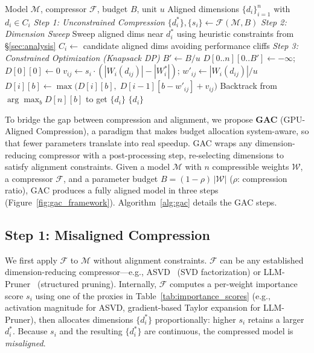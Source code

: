 \documentclass[sigplan,10pt]{acmart}
\begin{document}

\begin{algorithm}[t]
  \caption{GAC algorithm.}
  \label{alg:gac}
  \small
  \begin{algorithmic}[1]
  \Require Model $\mathcal{M}$, compressor $\mathcal{F}$, budget $B$, unit $u$
  \Ensure Aligned dimensions $\{d_i\}_{i=1}^n$ with $d_i \in C_i$
  \Statex \textit{Step 1: Unconstrained Compression}
  \State $\{d_i^*\}, \{s_i\} \gets \mathcal{F}(\mathcal{M}, B)$ 
  \Statex \textit{Step 2: Dimension Sweep}
    \State Sweep aligned dims near $d_i^*$ using heuristic constraints from \S\ref{sec:analysis}
    \State $C_i \gets$ candidate aligned dims avoiding performance cliffs
  \EndFor
  \Statex \textit{Step 3: Constrained Optimization (Knapsack DP)}
  \State $B' \gets B / u$ 
  \State $D[0..n][0..B'] \gets -\infty$;\; $D[0][0] \gets 0$
      \State $v_{ij} \gets s_i \cdot (|W_i(d_{ij})| {-} |W_i^*|)$;\; $w'_{ij} \gets |W_i(d_{ij})| / u$
        \State $D[i][b] \gets \max\!\bigl(D[i][b],\; D[i{-}1][b{-}w'_{ij}] + v_{ij}\bigr)$
      \EndFor
    \EndFor
  \EndFor
  \State Backtrack from $\arg\max_b D[n][b]$ to get $\{d_i\}$
  \State \Return $\{d_i\}$
  \end{algorithmic}
  \end{algorithm}
  
To bridge the gap between compression and alignment, we propose \textbf{GAC} (GPU-Aligned Compression), a paradigm that makes budget allocation system-aware, so that fewer parameters translate into real speedup.
GAC wraps any dimension-reducing compressor with a post-processing step, re-selecting dimensions to satisfy alignment constraints.
Given a model $\mathcal{M}$ with $n$ compressible weights $\mathcal{W}$, a compressor $\mathcal{F}$, and a parameter budget $B {=} (1{-}\rho)\,|\mathcal{W}|$ ($\rho$: compression ratio), GAC produces a fully aligned model in three steps
(Figure~\ref{fig:gac_framework}).
Algorithm~\ref{alg:gac} details the GAC steps.

\subsection{Step 1: Misaligned Compression}
\label{sec:step1}

We first apply $\mathcal{F}$ to $\mathcal{M}$ without alignment constraints.
$\mathcal{F}$ can be any established dimension-reducing compressor---e.g., ASVD~\citep{asvd} (SVD factorization) or LLM-Pruner~\citep{llmpruner} (structured pruning).
Internally, $\mathcal{F}$ computes a per-weight importance score $s_i$ using one of the proxies in Table~\ref{tab:importance_scores} (e.g., activation magnitude for ASVD, gradient-based Taylor expansion for LLM-Pruner), then allocates dimensions $\{d_i^*\}$ proportionally: higher $s_i$ retains a larger $d_i^*$.
Because $s_i$ and the resulting $\{d_i^*\}$ are continuous, the compressed model is \emph{misaligned}.
\end{document}
